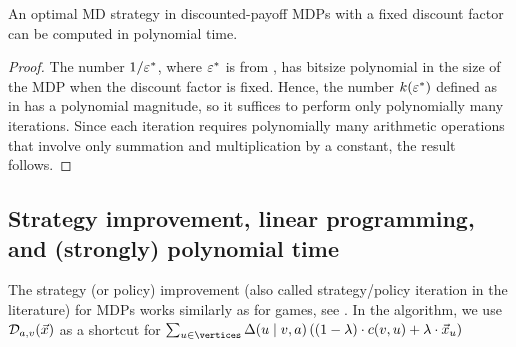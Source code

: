 \begin{corollary}
\label{5-cor:VI-optimal-strategy-comp}
An optimal MD strategy in discounted-payoff MDPs with a fixed discount factor can be computed in polynomial time. 
\end{corollary}
\begin{proof}
The number $1/\varepsilon^*$, where $\varepsilon^*$ is from , has bitsize polynomial in the size of the MDP when the discount factor is fixed. Hence, the number $k(\varepsilon^*)$ defined as in  has a polynomial magnitude, so it suffices to perform only polynomially many iterations. Since each iteration requires polynomially many arithmetic operations that involve only summation and multiplication by a constant, the result follows.
\end{proof}

\subsection*{Strategy improvement, linear programming, and (strongly) 
polynomial time}

The strategy (or policy) improvement (also called strategy/policy iteration in the literature) for MDPs works similarly as for games, see . In the algorithm, we use $\mathcal{D}_{a,v}(\vec{x})$ as a shortcut for $ \sum_{u \in \vertices}\probTranFunc(u\mid v,a)\left((1-\lambda)\cdot\colouring(v,u) + \lambda\cdot \vec{x}_u \right)$


